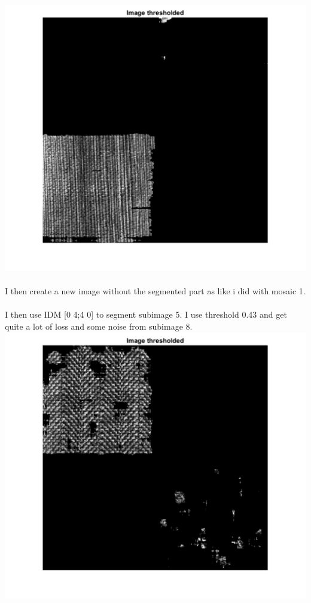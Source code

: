 \documentclass[12pt, letterpaper, twoside]{article}
\begin{document}
\includegraphics[scale=0.7]{"2sub7seg.png"}\\
\ \\
I then create a new image without the segmented part as like i did with mosaic 1.\\
\newpage
\ \\
I then use IDM [0 4;4 0] to segment subimage 5. I use threshold 0.43 and get quite a lot of loss and some noise from subimage 8.\\
\includegraphics[scale=0.7]{"2sub5seg.png"}\\
\end{document}
